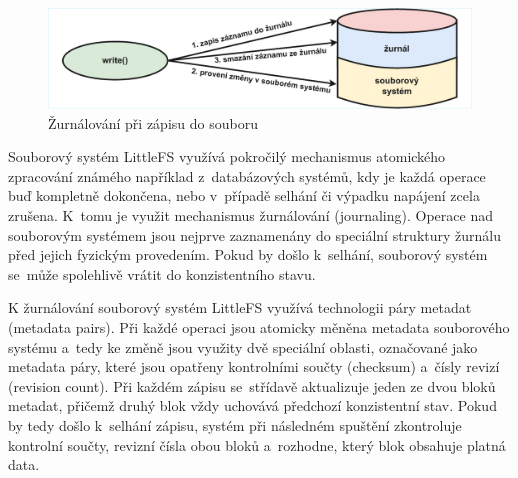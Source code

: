 \begin{figure}[h]
    \centering
    \includegraphics[width=1.00\textwidth]{obrazky-figures/journaling-experimental-2_cropped.pdf}
    
    \caption{Žurnálování při zápisu do souboru~\cite{architecture_and_design_of_the_linux_storage_stack}}
    \label{fig:journaling}
\end{figure}


Souborový systém LittleFS využívá pokročilý mechanismus atomického zpracování známého například z~databázových systémů, kdy je každá operace buď kompletně dokončena, nebo v~případě selhání či výpadku napájení zcela zrušena. K~tomu je využit mechanismus žurnálování (journaling). Operace nad souborovým systémem jsou nejprve zaznamenány do speciální struktury žurnálu před jejich fyzickým provedením. Pokud by došlo k~selhání, souborový systém se~může spolehlivě vrátit do konzistentního stavu.~\cite{nxp_the_design_of_the_little_filesystem}

K žurnálování souborový systém LittleFS využívá technologii páry metadat (metadata pairs). Při každé operaci jsou atomicky měněna metadata souborového systému a~tedy ke změně jsou využity dvě speciální oblasti, označované jako metadata páry, které jsou opatřeny kontrolními součty (checksum) a~čísly revizí (revision count). Při každém zápisu se~střídavě aktualizuje jeden ze dvou bloků metadat, přičemž druhý blok vždy uchovává předchozí konzistentní stav. Pokud by tedy došlo k~selhání zápisu, systém při následném spuštění zkontroluje kontrolní součty, revizní čísla obou bloků a~rozhodne, který blok obsahuje platná data.~\cite{nxp_the_design_of_the_little_filesystem}


